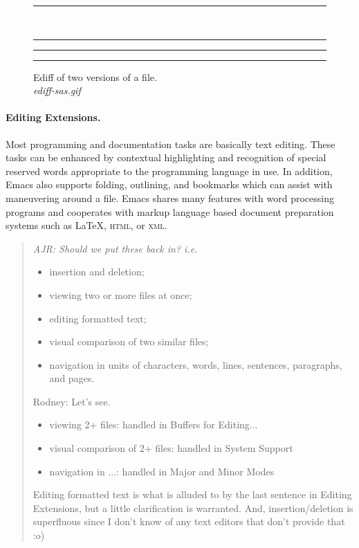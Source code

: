 \documentclass{article}
\newcommand{\emptyfig}{
\hspace*{42pt}\rule{324pt}{.25pt}\\
\hspace*{42pt}\rule{.25pt}{10pc}
\rule{316pt}{.25pt}
\rule{.25pt}{10pc}}
\newenvironment{Comment}{\begin{quote}\small\itshape }{\end{quote}}
\begin{document}
\begin{figure}
\emptyfig
\caption[place holder for a long caption]{Ediff of two versions of a file.\\
{\it ediff-sas.gif}
\label{f.ediff}}
\end{figure}

\paragraph{Editing Extensions.}
Most programming and documentation tasks are basically text editing.
These tasks can be enhanced by %
contextual highlighting and recognition of special reserved words
appropriate to the programming language in use.  In addition, Emacs
also supports folding, outlining, and bookmarks which can assist with
maneuvering around a file.  Emacs shares many features with word
processing programs and cooperates with markup language based document
preparation systems such as \LaTeX, \textsc{html}, or \textsc{xml}.

\begin{Comment}
  AJR: Should we put these back in? i.e.   
  \begin{itemize}
  \item insertion and deletion;
  \item viewing two or more files at once;
  \item editing formatted text;
  \item visual comparison of two similar files;
  \item navigation in units of characters, words, lines, sentences,
    paragraphs, and pages.
  \end{itemize}

Rodney:  Let's see. 
\begin{itemize}  
\item viewing 2+ files:  handled in Buffers for Editing...
\item visual comparison of 2+ files:  handled in System Support
\item navigation in ...:  handled in Major and Minor Modes
\end{itemize}
Editing formatted text is what is alluded to by the last sentence 
in Editing Extensions, but a little clarification is warranted.  And,
insertion/deletion is superfluous since I don't know of any text
editors that don't provide that :o)

\end{Comment}
\end{document}
